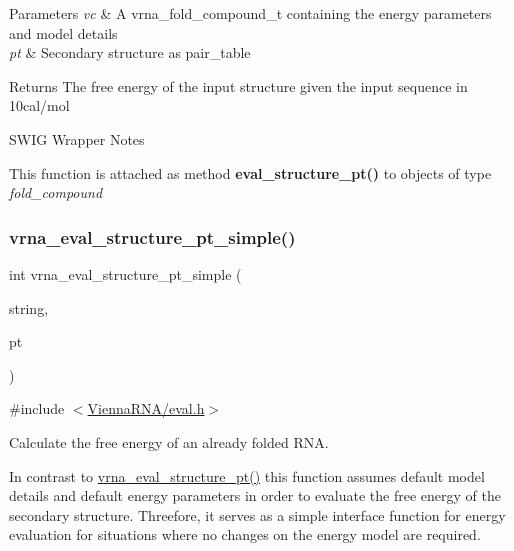 \begin{DoxyParams}{Parameters}
{\em vc} & A vrna\+\_\+fold\+\_\+compound\+\_\+t containing the energy parameters and model details \\
\hline
{\em pt} & Secondary structure as pair\+\_\+table \\
\hline
\end{DoxyParams}
\begin{DoxyReturn}{Returns}
The free energy of the input structure given the input sequence in 10cal/mol
\end{DoxyReturn}
\begin{DoxyRefDesc}{S\+W\+I\+G Wrapper Notes}
\item[\hyperlink{wrappers__wrappers000026}{S\+W\+I\+G Wrapper Notes}]This function is attached as method {\bfseries eval\+\_\+structure\+\_\+pt()} to objects of type {\itshape fold\+\_\+compound} \end{DoxyRefDesc}
\mbox{\label{group__eval_ga0bba59b4d6e53461088666ff4aece7b0}} 
\subsubsection{\texorpdfstring{vrna\+\_\+eval\+\_\+structure\+\_\+pt\+\_\+simple()}{vrna\_eval\_structure\_pt\_simple()}}
{\footnotesize\ttfamily int vrna\+\_\+eval\+\_\+structure\+\_\+pt\+\_\+simple (\begin{DoxyParamCaption}\item[{const char $\ast$}]{string,  }\item[{const short $\ast$}]{pt }\end{DoxyParamCaption})}



{\ttfamily \#include $<$\hyperlink{eval_8h}{Vienna\+R\+N\+A/eval.\+h}$>$}



Calculate the free energy of an already folded R\+NA. 

In contrast to \hyperlink{group__eval_gadbd09372ddfd7a450bbd590c96a6bfe4}{vrna\+\_\+eval\+\_\+structure\+\_\+pt()} this function assumes default model details and default energy parameters in order to evaluate the free energy of the secondary structure. Threefore, it serves as a simple interface function for energy evaluation for situations where no changes on the energy model are required.

